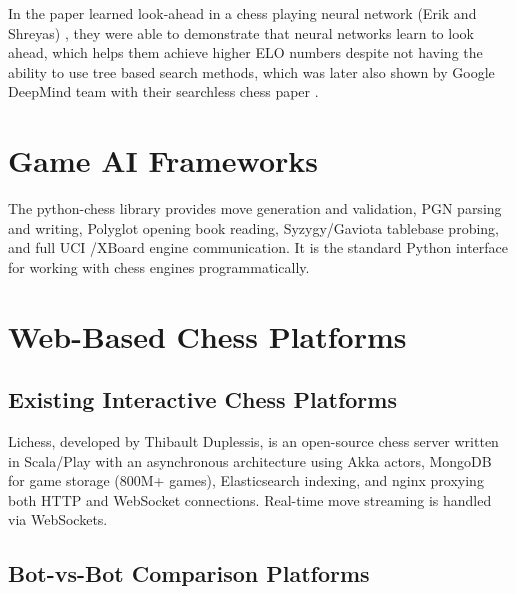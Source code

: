 In the paper learned look-ahead in a chess playing neural network (Erik and Shreyas) \cite{look_ahead_chess_nn}, they were able to demonstrate that neural networks learn to look ahead, which helps them achieve higher ELO numbers despite not having the ability to use tree based search methods, which was later also shown by Google DeepMind team with their searchless chess paper \cite{searchless_chess}.


\section{Game AI Frameworks}

The python-chess \cite{python_chess} library provides move generation and validation, PGN parsing and writing, Polyglot opening book reading, Syzygy/Gaviota tablebase probing, and full UCI \cite{uci}/XBoard engine communication. It is the standard Python interface for working with chess engines programmatically.


\section{Web-Based Chess Platforms}
\subsection{Existing Interactive Chess Platforms}

Lichess, developed by Thibault Duplessis, is an open-source chess server \cite{lila} written in Scala/Play with an asynchronous architecture using Akka actors, MongoDB for game storage (800M+ games), Elasticsearch indexing, and nginx proxying both HTTP and WebSocket connections. Real-time move streaming is handled via WebSockets.

\subsection{Bot-vs-Bot Comparison Platforms}

